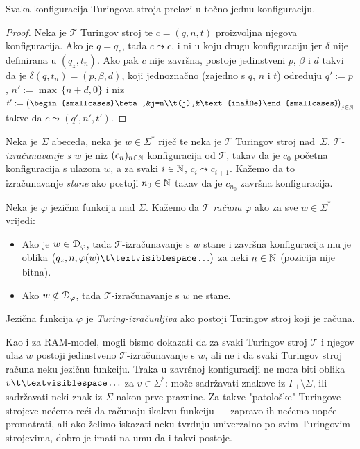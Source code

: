 \begin{lema}[{name=[determinističnost Turingovih strojeva]}]\label{lm:Turingdet}
Svaka konfiguracija Turingova stroja prelazi u točno jednu konfiguraciju.%
\end{lema}
\begin{proof}
	Neka je $\mathcal T$ Turingov stroj te $c=(q,n,t)$ proizvoljna njegova konfiguracija. Ako je $q=q_z$, tada $c\leadsto c$, i ni u koju drugu konfiguraciju jer $\delta$ nije definirana u $(q_z,t_n)$. Ako pak $c$ nije završna, postoje jedinstveni $p$, $\beta$ i $d$ takvi da je $\delta(q,t_n)=(p,\beta,d)$, koji jednoznačno (zajedno s $q$, $n$ i $t$) određuju $q':=p$, $n':=\max\,\{n+d,0\}$ i niz $t':=\bigl(\begin{smallcases}\beta,&j=n\\t(j),&\text{inače}\end{smallcases}\!\bigl)_{j\in\N}$ takve da $c\leadsto(q',n',t')$.
\end{proof}

\begin{definicija}[{name=[Turing-izračunljiva jezična funkcija]}]\label{def:Tcomputefi}
Neka je $\Sigma$ abeceda, neka je $w\in\Sigma^*$ riječ te neka je $\mathcal T$ Turingov stroj nad~$\Sigma$. \emph{$\mathcal T$\!-izračunavanje s $w$} je niz $(c_n)_{n\in{\mathbb N}}$ konfiguracija od $\mathcal T$, takav da je $c_0$ početna konfiguracija s ulazom $w$, a za svaki $i\in{\mathbb N}$, $c_i\leadsto c_{i+1}$. Kažemo da to izračunavanje \emph{stane} ako postoji $n_0\in{\mathbb N}$ takav da je $c_{n_0}$ završna konfiguracija.

Neka je $\varphi$ jezična funkcija nad $\Sigma$. Kažemo da $\mathcal T$ \emph{\!računa} $\varphi$ ako za sve $w\in\Sigma^*$ vrijedi:
\begin{itemize}
    \item Ako je $w\in\mathcal D_{\varphi}$, tada $\mathcal T$\!-izračunavanje s $w$ stane i završna konfiguracija mu je oblika $\bigl(q_z,n,\varphi(w)\bl\ldots\bigr)$ za neki $n\in{\mathbb N}$ (pozicija nije bitna).
    \item Ako $w\notin\mathcal D_{\varphi}$, tada $\mathcal T$\!-izračunavanje s $w$ ne stane.
\end{itemize}
Jezična funkcija $\varphi$ je \emph{Turing-izračunljiva} ako postoji Turingov stroj koji je računa.
\end{definicija}

Kao i za RAM-model, mogli bismo dokazati da za svaki Turingov stroj $\mathcal T$ i njegov ulaz $w$ postoji jedinstveno $\mathcal T$\!-izračunavanje s $w$, ali ne i da svaki Turingov stroj računa neku jezičnu funkciju. Traka u završnoj konfiguraciji ne mora biti oblika $v\bl\ldots$ za $v\in\Sigma^*$: može sadržavati znakove iz $\Gamma_+\!\setminus\Sigma$, ili sadržavati neki znak iz $\Sigma$ nakon prve praznine. Za takve "patološke" Turingove strojeve nećemo reći da računaju ikakvu funkciju --- zapravo ih nećemo uopće promatrati, ali ako želimo iskazati neku tvrdnju univerzalno po svim Turingovim strojevima, dobro je imati na umu da i takvi postoje.

